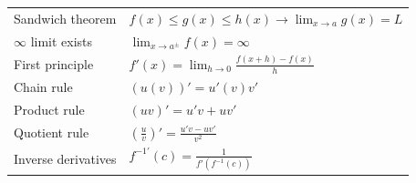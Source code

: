 \documentclass{article}
\begin{document}
\begin{tabular}{|l|l|}
    Sandwich theorem                    & $f(x)\leq g(x)\leq h(x)\to\lim_{x\to a}g(x)=L$                                                                                                                                                                                                                                                       \\
    $\infty$ limit exists               & $\lim_{x\to a^\pm}f(x)=\infty$                                                                                                                                                                                                                                                                       \\
    First principle                     & $f'(x)=\lim_{h\to0}\frac{f(x+h)-f(x)}{h}$                                                                                                                                                                                                                                                            \\
    Chain rule                          & $(u(v))' = u'(v)v'$                                                                                                                                                                                                                                                                                  \\
    Product rule                        & $(uv)' = u'v+uv'$                                                                                                                                                                                                                                                                                    \\
    Quotient rule                       & $\left(\frac{u}{v}\right)' = \frac{u'v-uv'}{v^2}$                                                                                                                                                                                                                                                    \\
    Inverse derivatives                 & $f^{-1'}(c) = \frac{1}{f'(f^{-1}(c))}$                                                                                                                                                                                                                                                               \\

\end{tabular}
\end{document}
